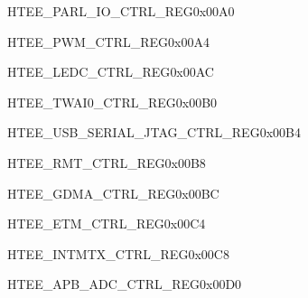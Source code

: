 \begin{register}{H}{TEE\_PARL\_IO\_CTRL\_REG}{0x00A0}\label{regdesc:TEEPARLIOCTRLREG}
\end{register}\vspace{-3em}

\begin{register}{H}{TEE\_PWM\_CTRL\_REG}{0x00A4}\label{regdesc:TEEPWMCTRLREG}
\end{register}\vspace{-3em}

\begin{register}{H}{TEE\_LEDC\_CTRL\_REG}{0x00AC}\label{regdesc:TEELEDCCTRLREG}
\end{register}\vspace{-3em}

\begin{register}{H}{TEE\_TWAI0\_CTRL\_REG}{0x00B0}\label{regdesc:TEETWAI0CTRLREG}
\end{register}\vspace{-3em}

\begin{register}{H}{TEE\_USB\_SERIAL\_JTAG\_CTRL\_REG}{0x00B4}\label{regdesc:TEEUSBSERIALJTAGCTRLREG}
\end{register}\vspace{-3em}

\begin{register}{H}{TEE\_RMT\_CTRL\_REG}{0x00B8}\label{regdesc:TEERMTCTRLREG}
\end{register}\vspace{-3em}

\begin{register}{H}{TEE\_GDMA\_CTRL\_REG}{0x00BC}\label{regdesc:TEEGDMACTRLREG}
\end{register}\vspace{-3em}

\begin{register}{H}{TEE\_ETM\_CTRL\_REG}{0x00C4}\label{regdesc:TEEETMCTRLREG}
\end{register}\vspace{-3em}

\begin{register}{H}{TEE\_INTMTX\_CTRL\_REG}{0x00C8}\label{regdesc:TEEINTMTXCTRLREG}
\end{register}\vspace{-3em}

\begin{register}{H}{TEE\_APB\_ADC\_CTRL\_REG}{0x00D0}\label{regdesc:TEEAPBADCCTRLREG}
\end{register}\vspace{-3em}

